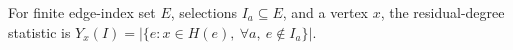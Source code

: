 \begin{definition}
For finite edge-index set $E$, selections $I_a\subseteq E$, and a vertex
$x$, the residual-degree statistic is
$Y_x(I)=|\{e:x\in H(e),\ \forall a,\ e\notin I_a\}|$.
\end{definition}

